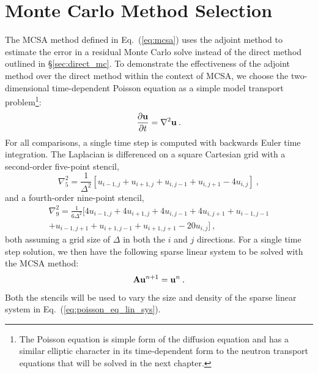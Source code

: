 \section{Monte Carlo Method Selection}
\label{sec:mc_method_selection}
The MCSA method defined in Eq.~(\ref{eq:mcsa}) uses the adjoint method
to estimate the error in a residual Monte Carlo solve instead of the
direct method outlined in \S\ref{sec:direct_mc}. To demonstrate the
effectiveness of the adjoint method over the direct method within the
context of MCSA, we choose the two-dimensional time-dependent Poisson
equation as a simple model transport problem\footnote{The Poisson
  equation is simple form of the diffusion equation and has a similar
  elliptic character in its time-dependent form to the neutron
  transport equations that will be solved in the next chapter.}:
\begin{equation}
  \frac{\partial \mathbf{u}}{\partial t} = \nabla^2 \mathbf{u}\:.
  \label{eq:poisson_equation}
\end{equation}
For all comparisons, a single time step is computed with backwards Euler time
integration. The Laplacian is differenced on a square Cartesian grid with a
second-order five-point stencil,
\begin{equation}
  \nabla^2_5 = \frac{1}{\Delta^2}[u_{i-1,j} + u_{i+1,j} + u_{i,j-1} +
    u_{i,j+1} - 4 u_{i,j}]\:,
  \label{eq:five_point_stencil}
\end{equation}
and a fourth-order nine-point stencil,
\begin{multline}
  \nabla^2_9 = \frac{1}{6\Delta^2}[4 u_{i-1,j} + 4 u_{i+1,j} + 4
    u_{i,j-1} + 4 u_{i,j+1} + u_{i-1,j-1}\\ + u_{i-1,j+1} +
    u_{i+1,j-1} + u_{i+1,j+1} - 20 u_{i,j}]\:,
  \label{eq:nine_point_stencil}
\end{multline}
both assuming a grid size of $\Delta$ in both the $i$ and $j$ directions. For
a single time step solution, we then have the following sparse linear system
to be solved with the MCSA method:
\begin{equation}
  \mathbf{A} \mathbf{u}^{n+1} = \mathbf{u}^n\:.
  \label{eq:poisson_eq_lin_sys}
\end{equation}
Both the stencils will be used to vary the size and density of the sparse
linear system in Eq.~(\ref{eq:poisson_eq_lin_sys}).

